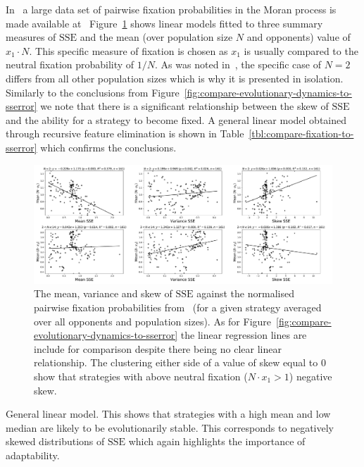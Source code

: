 \documentclass[a4paper]{article}
\newcommand{\SSe}{\text{SSE}}
\begin{document}
In~\cite{Moran1707} a large data set of pairwise fixation probabilities in the
Moran process is made available at~\cite{vincent_knight_2017_1040129}
Figure~\ref{fig:compare-fixation-to-sserror} shows linear models fitted to three
summary measures of \(\SSe\) and the mean (over population size \(N\) and
opponents) value of \(x_1\cdot N\). This specific measure of fixation is chosen
as \(x_1\) is usually compared to the neutral fixation probability of \(1 / N\).
As was noted in~\cite{Moran1707}, the specific case of \(N=2\) differs from all
other population sizes which is why it is presented in isolation. Similarly to
the conclusions from Figure~\ref{fig:compare-evolutionary-dynamics-to-sserror}
we note that there is a significant relationship between the skew of
\(\SSe\) and the ability for a strategy to become fixed.
A general linear model obtained through recursive feature elimination is shown
in Table~\ref{tbl:compare-fixation-to-sserror} which confirms the conclusions.

\begin{figure}[!hbtp]
    \centering
    \includegraphics[width=\textwidth]{./assets/img/compare-fixation-to-sserror/main.pdf}
    \caption{The mean, variance and skew of
    \(\SSe\) against the normalised pairwise fixation probabilities
    from~\cite{Moran1707} (for a given strategy averaged over all opponents and
    population sizes). As for
    Figure~\ref{fig:compare-evolutionary-dynamics-to-sserror} the linear
    regression lines are include for comparison despite there being no clear
    linear relationship. The clustering either side of a value of skew equal to
    0 show that strategies with above neutral
    fixation (\(N\cdot x_1>1\)) negative skew.}
    \label{fig:compare-fixation-to-sserror}
\end{figure}

\begin{table}[!hbtp]
    \begin{center}
    \tiny
    
    \end{center}
    \caption{General linear model. This shows that strategies with a high mean
        and low median are likely to be evolutionarily stable. This corresponds
        to negatively skewed distributions of \(\SSe\) which again highlights
        the importance of adaptability.}
    \label{tbl:compare-fixation-to-sserror}
\end{table}
\end{document}
